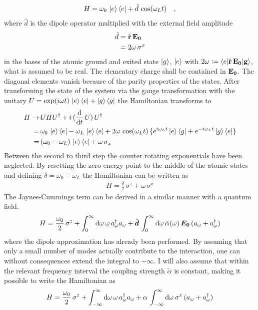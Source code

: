 \documentclass{article}
\begin{document}
\begin{align*}
    H = \omega_0\,\ket{e}\bra{e}+ \hat{d}\,\cos(\omega_Lt)\quad,
\end{align*} 
where $\hat{d}$ is the dipole operator multiplied with the external field amplitude
\begin{align*}
    \hat{d}&=\hat{\bf{r}}\,\bf{E_0}\\
    &=2\omega\, \sigma^x
\end{align*}
in the bases of the atomic ground and exited state $\ket{g}$, $\ket{e}$ with $2\omega\vcentcolon=\braket{e|\hat{\bf{r}}\,\bf{E_0}|g}$, what is assumed to be real. The elementary charge shall be contained in $\bf{E_0}$. The diagonal elements vanish because of the parity properties of the states. After transforming the state of the system via the gauge transformation with the unitary $U=\exp(i\omega t)\,\ket{e}\bra{e}+\ket{g}\bra{g}$ the Hamiltonian transforms to 
\begin{align*}
    H\rightarrow \,&UHU^\dagger+i\,(\frac{\text{d}}{\text{d} t}\,U)\,U^\dagger\\
    =\,&\omega_0\,\ket{e}\bra{e}-\omega_L\,\ket{e}\bra{e} + 2\omega\,\cos(\omega_L t)\,\{e^{i\omega_L t} \ket{e}\bra{g}+e^{-i\omega_L t}\ket{g}\bra{e}\}\\
    =\,&(\omega_0-\omega_L)\,\ket{e}\bra{e}+\omega\,\sigma_x
\end{align*}
Between the second to third step the counter rotating exponentials have been neglected. By resetting the zero energy point to the middle of the atomic states and defining $\delta=\omega_0-\omega_L$ the Hamiltonian can be written as
\begin{align*}
    H = \frac{\delta}{2}\,\sigma^z+ \omega\,\sigma^x
\end{align*}
The Jaynes-Cummings term can be derived in a similar manner with a quantum field. 
\begin{align*}
    H= \frac{\omega_0}{2}\,\sigma^z+\int_{0}^\infty\text{d}\omega\,\omega\,a^\dagger_\omega a_\omega+ \hat{\boldsymbol{d}}\,\int_{0}^\infty\text{d}\omega\,\tilde{\alpha}(\omega)\,\boldsymbol{E_0}\,(a_\omega+a^\dagger_\omega)
\end{align*}
where the dipole approximation has already been performed. By assuming that only a small number of modes actually contribute to the interaction, one can without consequences extend the integral to $-\infty$. I will also assume that within the relevant frequency interval the coupling strength $\tilde{\alpha}$ is constant, making it possible to write the Hamiltonian as
\begin{align*}
    H= \frac{\omega_0}{2}\,\sigma^z+\int_{-\infty}^\infty\text{d}\omega\,\omega\,a^\dagger_\omega a_\omega+ \alpha\,\int_{-\infty}^\infty\text{d}\omega\,\sigma^x\,(a_\omega+a^\dagger_\omega)
\end{align*}
\end{document}
